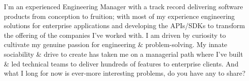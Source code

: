 

\begin{cvparagraph}

I'm an experienced Engineering Manager with a track record delivering software products from conception to fruition; with most of my experience engineering solutions for enterprise applications and developing the APIs/SDKs to transform the offering of the companies I've worked with. I am driven by curiosity to cultivate my genuine passion for engineering \& problem-solving. My innate sociability \& drive to create has taken me on a managerial path where I've built \& led technical teams to deliver hundreds of features to enterprise clients. And what I long for now is ever-more interesting problems, do you have any to share?
\end{cvparagraph}
